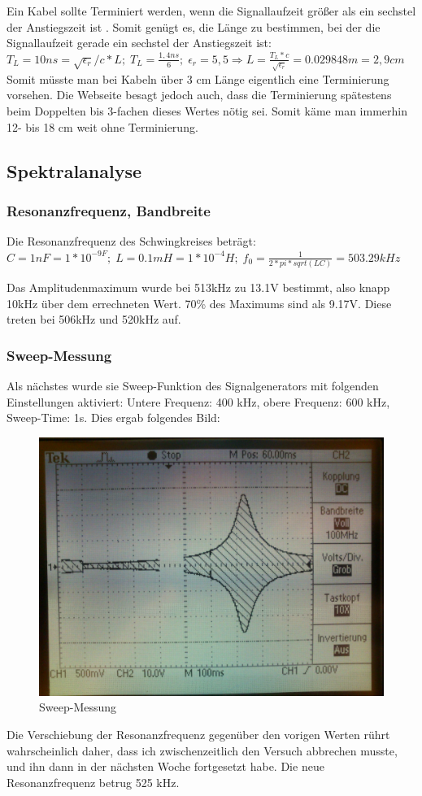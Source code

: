 Ein Kabel sollte Terminiert werden, wenn die Signallaufzeit größer als ein sechstel der Anstiegszeit ist \cite{myc-wellenwiderstand}. Somit genügt es, die Länge zu bestimmen, bei der die Signallaufzeit gerade ein sechstel der Anstiegszeit ist:
$ T_L=10ns=\sqrt{\epsilon_r}/c*L;\; T_L=\frac{1,4ns}{6};\; \epsilon_r=5,5 \Rightarrow L=\frac{T_L*c}{\sqrt{\epsilon_r}}=0.029848m=2,9cm $\\
Somit müsste man bei Kabeln über 3 cm Länge eigentlich eine Terminierung vorsehen. Die Webseite besagt jedoch auch, dass die Terminierung spätestens beim Doppelten bis 3-fachen dieses Wertes nötig sei. Somit käme man immerhin 12- bis 18 cm weit ohne Terminierung.

\subsection{Spektralanalyse}
\subsubsection{Resonanzfrequenz, Bandbreite}
Die Resonanzfrequenz des Schwingkreises beträgt:\\
$ C=1nF=1*10^{-9 F};\; L=0.1mH=1*10^{-4} H;\; f_0=\frac{1}{2*pi*sqrt(LC)} =  503.29kHz $

Das Amplitudenmaximum wurde bei 513kHz zu 13.1V bestimmt, also knapp 10kHz über dem errechneten Wert. 70\% des Maximums sind als 9.17V. Diese treten bei 506kHz und 520kHz auf.

\subsubsection{Sweep-Messung}
Als nächstes wurde sie Sweep-Funktion des Signalgenerators mit folgenden Einstellungen aktiviert: Untere Frequenz: 400 kHz, obere Frequenz: 600 kHz, Sweep-Time: 1s. Dies ergab folgendes Bild:
\begin{figure}[H]
	\centering
	\includegraphics[width=\linewidth]{versuch4/oszi/DSC_0397.JPG}
	\caption{Sweep-Messung}
\end{figure}
Die Verschiebung der Resonanzfrequenz gegenüber den vorigen Werten rührt wahrscheinlich daher, dass ich zwischenzeitlich den Versuch abbrechen musste, und ihn dann in der nächsten Woche fortgesetzt habe. Die neue Resonanzfrequenz betrug 525 kHz.

